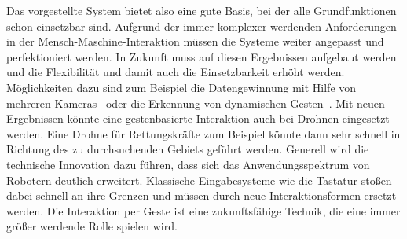 Das vorgestellte System bietet also eine gute Basis, bei der alle Grundfunktionen schon einsetzbar sind. Aufgrund der immer komplexer werdenden Anforderungen in der Mensch-Maschine-Interaktion müssen die Systeme weiter angepasst und perfektioniert werden. In Zukunft muss auf diesen Ergebnissen aufgebaut werden und die Flexibilität und damit auch die Einsetzbarkeit erhöht werden. Möglichkeiten dazu sind zum Beispiel die Datengewinnung mit Hilfe von mehreren Kameras~\cite{multipleDepthCameras} oder die Erkennung von dynamischen Gesten~\cite{hiddenMarkov}. Mit neuen Ergebnissen könnte eine gestenbasierte Interaktion auch bei Drohnen eingesetzt werden. Eine Drohne für Rettungskräfte zum Beispiel könnte dann sehr schnell in Richtung des zu durchsuchenden Gebiets geführt werden. Generell wird die technische Innovation dazu führen, dass sich das Anwendungsspektrum von Robotern deutlich erweitert. Klassische Eingabesysteme wie die Tastatur stoßen dabei schnell an ihre Grenzen und müssen durch neue Interaktionsformen ersetzt werden. Die Interaktion per Geste ist eine zukunftsfähige Technik, die eine immer größer werdende Rolle spielen wird.  

 